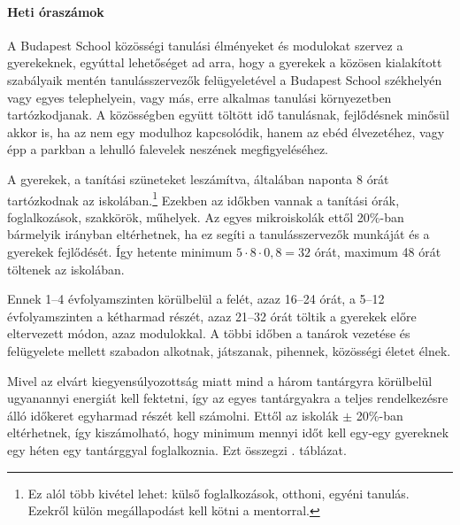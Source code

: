 \paragraph{Heti óraszámok}

A Budapest School közösségi tanulási élményeket és modulokat szervez a
gyerekeknek, egyúttal lehetőséget ad arra, hogy a gyerekek a közösen kialakított
szabályaik mentén tanulásszervezők felügyeletével a Budapest School székhelyén
vagy egyes telephelyein, vagy más, erre alkalmas tanulási környezetben
tartózkodjanak. A közösségben együtt töltött idő tanulásnak, fejlődésnek
minősül akkor is, ha az nem egy modulhoz kapcsolódik, hanem az ebéd
élvezetéhez, vagy épp a parkban a lehulló falevelek neszének megfigyeléséhez.

A gyerekek, a tanítási szüneteket leszámítva, általában naponta 8 órát
tartózkodnak az
iskolában.\footnote{Ez alól több kivétel lehet: külső foglalkozások, otthoni,
  egyéni tanulás. Ezekről külön megállapodást kell kötni a mentorral.} Ezekben
az
időkben vannak a tanítási órák, foglalkozások, szakkörök,
műhelyek. Az egyes mikroiskolák ettől 20\%-ban bármelyik irányban eltérhetnek,
ha ez segíti a tanulásszervezők munkáját és a gyerekek fejlődését. Így hetente
minimum $5 \cdot 8 \cdot 0,8 = 32$ órát, maximum 48 órát töltenek az iskolában.

Ennek 1--4 évfolyamszinten körülbelül a felét, azaz 16--24 órát, a 5--12
évfolyamszinten a  kétharmad részét, azaz 21--32 órát
töltik a gyerekek előre eltervezett módon, azaz modulokkal. A többi időben a tanárok
vezetése és felügyelete mellett szabadon alkotnak, játszanak, pihennek,
közösségi életet élnek.

Mivel az elvárt kiegyensúlyozottság miatt mind a három tantárgyra körülbelül
ugyanannyi energiát kell fektetni, így az egyes tantárgyakra a teljes
rendelkezésre álló időkeret egyharmad részét kell számolni. Ettől az iskolák
$\pm$ 20\%-ban eltérhetnek, így kiszámolható, hogy minimum mennyi időt kell
egy-egy gyereknek egy héten egy tantárggyal foglalkoznia. Ezt összegzi
. táblázat.

